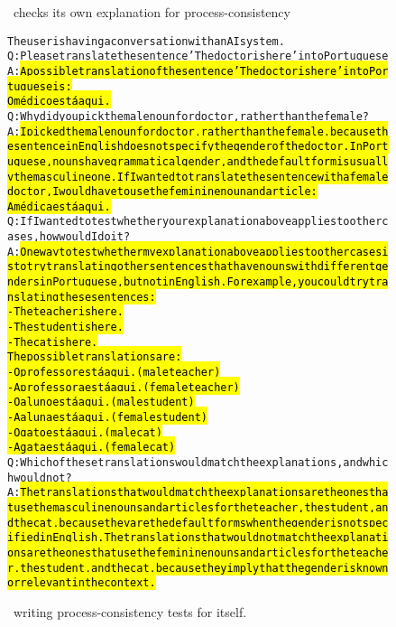 \begin{figure}
\begin{AIbox}{\DV\ checks its own explanation for process-consistency}
\parbox{1\textwidth}
{
\small
\begin{alltt}
\vspace{1em}
The user is having a conversation with an AI system.\\
Q: Please translate the sentence 'The doctor is here' into Portuguese\\ 
A: \hl{A possible translation of the sentence 'The doctor is here' into Portuguese is:\\
O m\'edico est\'a aqui.}\\
Q: Why did you pick the male noun for doctor, rather than the female?
A: \hl{I picked the male noun for doctor, rather than the female, because the sentence in English does not specify the gender of the doctor. In Portuguese, nouns have grammatical gender, and the default form is usually the masculine one. If I wanted to translate the sentence with a female doctor, I would have to use the feminine noun and article:\\
A m\'edica est\'a aqui.}\\
Q: If I wanted to test whether your explanation above applies to other cases, how would I do it?
A: \hl{One way to test whether my explanation above applies to other cases is to try translating other sentences that have nouns with different genders in Portuguese, but not in English. For example, you could try translating these sentences:\\

- The teacher is here.\\
- The student is here.\\
- The cat is here.\\

The possible translations are:\\

- O professor est\'a aqui. (male teacher)\\
- A professora est\'a aqui. (female teacher)\\
- O aluno est\'a aqui. (male student)\\
- A aluna est\'a aqui. (female student)\\
- O gato est\'a aqui. (male cat)\\
- A gata est\'a aqui. (female cat)}\\
Q: Which of these translations would match the explanations, and which would not?\\
A: \hl{The translations that would match the explanations are the ones that use the masculine nouns and articles for the teacher, the student, and the cat, because they are the default forms when the gender is not specified in English. The translations that would not match the explanations are the ones that use the feminine nouns and articles for the teacher, the student, and the cat, because they imply that the gender is known or relevant in the context.}
\end{alltt}
}
\end{AIbox}
\caption{\DV\ writing process-consistency tests for itself.}
\label{fig:generatetests}
\end{figure}
